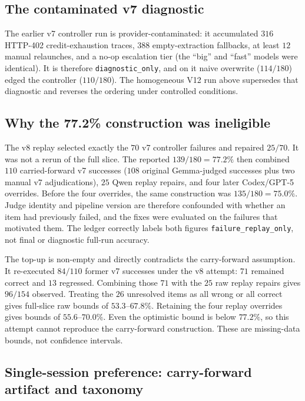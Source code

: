 \subsection{The contaminated v7 diagnostic}

The earlier v7 controller run is provider-contaminated: it accumulated $316$
HTTP-402 credit-exhaustion traces, $388$ empty-extraction fallbacks, at least
$12$ manual relaunches, and a no-op escalation tier (the ``big'' and ``fast''
models were identical). It is therefore \texttt{diagnostic\_only}, and on it
naive overwrite ($114/180$) edged the controller ($110/180$). The homogeneous
V12 run above supersedes that diagnostic and reverses the ordering under
controlled conditions.

\subsection{Why the 77.2\% construction was ineligible}

The v8 replay selected exactly the $70$ v7 controller failures and repaired
$25/70$. It was not a rerun of the full slice. The reported $139/180=77.2\%$
then combined $110$ carried-forward v7 successes ($108$ original
Gemma-judged successes plus two manual v7 adjudications), $25$ Qwen replay
repairs, and four later Codex/GPT-5 overrides. Before the four overrides, the
same construction was $135/180=75.0\%$. Judge identity and pipeline version are
therefore confounded with whether an item had previously failed, and the fixes
were evaluated on the failures that motivated them. The ledger correctly labels
both figures \texttt{failure\_replay\_only}, not final or diagnostic full-run
accuracy.

The top-up is non-empty and directly contradicts the carry-forward assumption.
It re-executed $84/110$ former v7 successes under the v8 attempt: $71$ remained
correct and $13$ regressed. Combining those $71$ with the $25$ raw replay
repairs gives $96/154$ observed. Treating the $26$ unresolved items as all wrong
or all correct gives full-slice raw bounds of $53.3$--$67.8\%$. Retaining the
four replay overrides gives bounds of $55.6$--$70.0\%$. Even the optimistic
bound is below $77.2\%$, so this attempt cannot reproduce the carry-forward
construction. These are missing-data bounds, not confidence intervals.

\subsection{Single-session preference: carry-forward artifact and taxonomy}
\label{sec:v7taxonomy}

